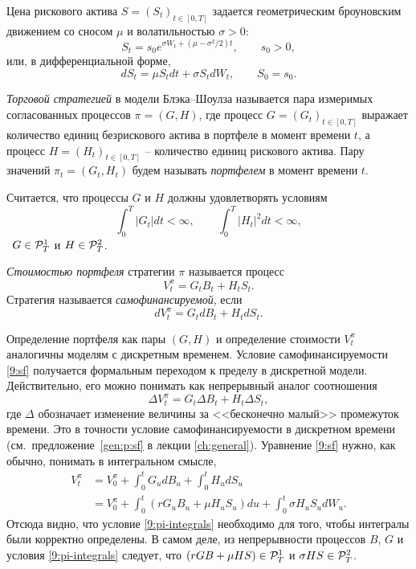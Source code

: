 Цена рискового актива $S=(S_t)_{t\in[0,T]}$ задается геометрическим броуновским движением со сносом $\mu$ и волатильностью $\sigma>0$:
\[
S_t = s_0 e^{\sigma W_t + (\mu-\sigma^2/2)t}, \qquad s_0 > 0,
\]
или, в дифференциальной форме,
\[
d S_t = \mu S_t dt + \sigma S_t d W_t, \qquad S_0=s_0.
\]

\begin{definition}
\emph{Торговой стратегией} в модели Блэка--Шоулза называется пара измеримых согласованных процессов $\pi=(G,H)$, где процесс $G=(G_t)_{t\in[0,T]}$ выражает количество единиц безрискового актива в портфеле в момент времени $t$, а процесс $H=(H_t)_{t\in[0,T]}$ -- количество единиц рискового актива.
Пару значений $\pi_t=(G_t,H_t)$ будем называть \emph{портфелем} в момент времени $t$.

Считается, что процессы $G$ и $H$ должны удовлетворять условиям
\begin{equation}
\label{9:pi-integrals}
\int_0^T |G_t| dt < \infty, \qquad \int_0^T |H_t|^2 dt < \infty,
\end{equation}
\te\ $G\in\mathcal{P}^1_T$ и $H\in\mathcal{P}^2_T$.
\end{definition}

\begin{definition}
\emph{Стоимостью портфеля} стратегии $\pi$ называется процесс 
\[
V_t^\pi = G_t B_t + H_t S_t.
\]
Стратегия называется \emph{самофинансируемой}, если 
\begin{equation}
\label{9:sf}
d V_t^\pi = G_t d B_t + H_t d S_t.
\end{equation}
\end{definition}

Определение портфеля как пары $(G,H)$ и определение стоимости $V_t^\pi$ аналогичны моделям с дискретным временем.
Условие самофинансируемости \eqref{9:sf} получается формальным переходом к пределу в дискретной модели.
Действительно, его можно понимать как непрерывный аналог соотношения
\label{9:self-financing-discrete}
\[
\Delta V_t^\pi = G_t\Delta B_t + H_t \Delta S_t,
\]
где $\Delta$ обозначает изменение величины за <<бесконечно малый>> промежуток времени.
Это в точности условие самофинансируемости в дискретном времени (см.~предложение~\ref{gen:p:sf} в лекции \ref{ch:general}). 
Уравнение \eqref{9:sf} нужно, как обычно, понимать в интегральном смысле, \te
\[
\begin{split}
V_t^\pi &= V_0^\pi + \int_0^t G_u d B_u + \int_0^t H_u d S_u \\
&= V_0^\pi + \int_0^t (r G_u B_u + \mu H_u S_u) du + \int_0^t \sigma H_u S_u d W_u.
\end{split}
\]
Отсюда видно, что условие \eqref{9:pi-integrals} необходимо для того, чтобы интегралы были корректно определены.
В самом деле, из непрерывности процессов $B$, $G$ и условия \eqref{9:pi-integrals} следует, что $(rGB+\mu HS) \in \mathcal{P}^1_T$ и $\sigma HS \in \mathcal{P}^2_T$.

